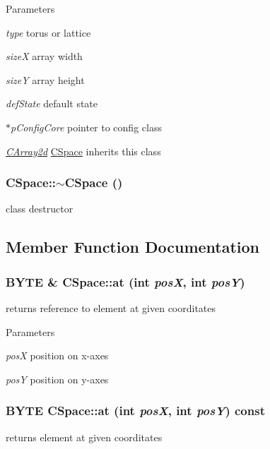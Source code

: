 \begin{DoxyParams}{Parameters}
\item[{\em type}]torus or lattice \item[{\em sizeX}]array width \item[{\em sizeY}]array height \item[{\em defState}]default state \item[{\em $\ast$pConfigCore}]pointer to config class\item[{\em \hyperlink{classCArray2d}{CArray2d}}]\hyperlink{classCSpace}{CSpace} inherits this class \end{DoxyParams}
\hypertarget{classCSpace_a6315ca8443a78458dca1ba8f2b8cf60d}{
\subsubsection[{$\sim$CSpace}]{\setlength{\rightskip}{0pt plus 5cm}CSpace::$\sim$CSpace ()}}
\label{classCSpace_a6315ca8443a78458dca1ba8f2b8cf60d}
class destructor 

\subsection{Member Function Documentation}
\hypertarget{classCSpace_abfac3ba5b7bf020e658b2a52ebcb7f36}{
\subsubsection[{at}]{\setlength{\rightskip}{0pt plus 5cm}BYTE \& CSpace::at (int {\em posX}, \/  int {\em posY})}}
\label{classCSpace_abfac3ba5b7bf020e658b2a52ebcb7f36}
returns reference to element at given coorditates


\begin{DoxyParams}{Parameters}
\item[{\em posX}]position on x-\/axes \item[{\em posY}]position on y-\/axes \end{DoxyParams}
\hypertarget{classCSpace_a670a753794c1e851cc337f2f312c2538}{
\subsubsection[{at}]{\setlength{\rightskip}{0pt plus 5cm}BYTE CSpace::at (int {\em posX}, \/  int {\em posY}) const}}
\label{classCSpace_a670a753794c1e851cc337f2f312c2538}
returns element at given coorditates


